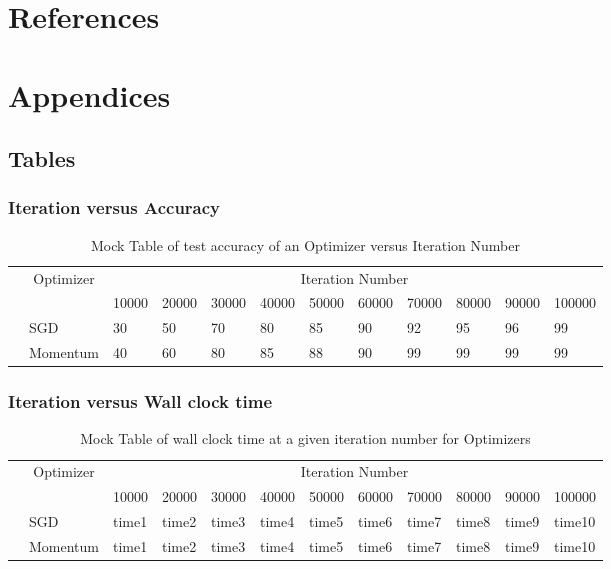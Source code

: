\documentclass{article}
\begin{document}
\section{References}	
	


\section{Appendices}
\subsection{Tables}
\subsubsection{Iteration versus Accuracy}
\label{sec:IvsTA}
	\begin{table}[H]
		\begin{tabular}{l|l|l|l|l|l|l|l|l|l|l|l|}
			\cline{2-12}
			& \multicolumn{1}{c|}{\multirow{2}{*}{Optimizer}} & \multicolumn{10}{c|}{Iteration Number}                                         \\ \cline{3-12} 
			& \multicolumn{1}{c|}{}                           & 10000 & 20000 & 30000 & 40000 & 50000 & 60000 & 70000 & 80000 & 90000 & 100000 \\ \cline{2-12} 
			& SGD                                             & 30    & 50    & 70    & 80    & 85    & 90    & 92    & 95    & 96    & 99     \\ \cline{2-12} 
			& Momentum                                        & 40    & 60    & 80    & 85    & 88    & 90    & 99    & 99    & 99    & 99     \\ \cline{2-12} 
		\end{tabular}
		\caption{Mock Table of test accuracy of an Optimizer versus Iteration Number}
	\end{table}
\subsubsection{Iteration versus Wall clock time}
\label{sec:IvsWCT}
\begin{table}[H]
	\begin{tabular}{l|l|l|l|l|l|l|l|l|l|l|l|}
		\cline{2-12}
		& \multicolumn{1}{c|}{\multirow{2}{*}{Optimizer}} & \multicolumn{10}{c|}{Iteration Number}                                         \\ \cline{3-12} 
		& \multicolumn{1}{c|}{}                           & 10000 & 20000 & 30000 & 40000 & 50000 & 60000 & 70000 & 80000 & 90000 & 100000 \\ \cline{2-12} 
		& SGD                                             & time1 & time2 & time3 & time4 & time5 & time6 & time7 & time8 & time9 & time10 \\ \cline{2-12} 
		& Momentum                                        & time1 & time2 & time3 & time4 & time5 & time6 & time7 & time8 & time9 & time10 \\ \cline{2-12} 
	\end{tabular}
	\caption{Mock Table of wall clock time at a given iteration number for Optimizers}
\end{table}
\end{document}
